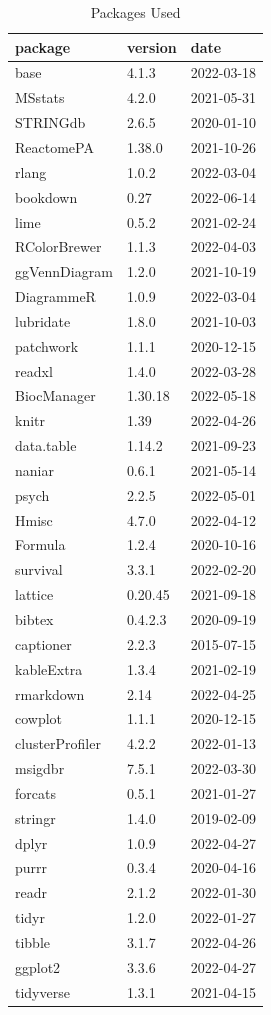 \documentclass[9pt,lineno]{elife}
\begin{document}
\begin{landscape}
\begin{landscape}
\begin{longtable}[t]{lll}
\caption{\label{tab:package-table}Packages Used}\\
\toprule
package & version & date\\
\midrule
base & 4.1.3 & 2022-03-18\\
MSstats & 4.2.0 & 2021-05-31\\
STRINGdb & 2.6.5 & 2020-01-10\\
ReactomePA & 1.38.0 & 2021-10-26\\
rlang & 1.0.2 & 2022-03-04\\
\addlinespace
bookdown & 0.27 & 2022-06-14\\
lime & 0.5.2 & 2021-02-24\\
RColorBrewer & 1.1.3 & 2022-04-03\\
ggVennDiagram & 1.2.0 & 2021-10-19\\
DiagrammeR & 1.0.9 & 2022-03-04\\
\addlinespace
lubridate & 1.8.0 & 2021-10-03\\
patchwork & 1.1.1 & 2020-12-15\\
readxl & 1.4.0 & 2022-03-28\\
BiocManager & 1.30.18 & 2022-05-18\\
knitr & 1.39 & 2022-04-26\\
\addlinespace
data.table & 1.14.2 & 2021-09-23\\
naniar & 0.6.1 & 2021-05-14\\
psych & 2.2.5 & 2022-05-01\\
Hmisc & 4.7.0 & 2022-04-12\\
Formula & 1.2.4 & 2020-10-16\\
\addlinespace
survival & 3.3.1 & 2022-02-20\\
lattice & 0.20.45 & 2021-09-18\\
bibtex & 0.4.2.3 & 2020-09-19\\
captioner & 2.2.3 & 2015-07-15\\
kableExtra & 1.3.4 & 2021-02-19\\
\addlinespace
rmarkdown & 2.14 & 2022-04-25\\
cowplot & 1.1.1 & 2020-12-15\\
clusterProfiler & 4.2.2 & 2022-01-13\\
msigdbr & 7.5.1 & 2022-03-30\\
forcats & 0.5.1 & 2021-01-27\\
\addlinespace
stringr & 1.4.0 & 2019-02-09\\
dplyr & 1.0.9 & 2022-04-27\\
purrr & 0.3.4 & 2020-04-16\\
readr & 2.1.2 & 2022-01-30\\
tidyr & 1.2.0 & 2022-01-27\\
\addlinespace
tibble & 3.1.7 & 2022-04-26\\
ggplot2 & 3.3.6 & 2022-04-27\\
tidyverse & 1.3.1 & 2021-04-15\\
\bottomrule
\end{longtable}


\end{landscape}
\end{landscape}
\end{document}
